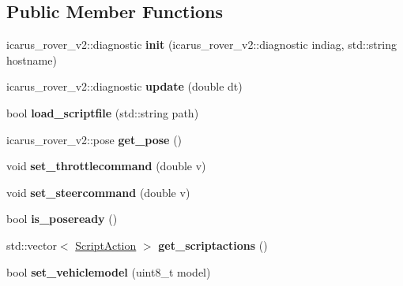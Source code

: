 \subsection*{Public Member Functions}
\begin{DoxyCompactItemize}
\item 
\mbox{\label{classSimulateNodeProcess_aa6d5582b3ebc13e2037b4e417303b46d}} 
icarus\+\_\+rover\+\_\+v2\+::diagnostic {\bfseries init} (icarus\+\_\+rover\+\_\+v2\+::diagnostic indiag, std\+::string hostname)
\item 
\mbox{\label{classSimulateNodeProcess_a0a40bd35c1c01b4da3da13ca603cde8e}} 
icarus\+\_\+rover\+\_\+v2\+::diagnostic {\bfseries update} (double dt)
\item 
\mbox{\label{classSimulateNodeProcess_a66bcc977a786a045d8e893504984001f}} 
bool {\bfseries load\+\_\+scriptfile} (std\+::string path)
\item 
\mbox{\label{classSimulateNodeProcess_a9b9aa14e25846adbd81a1302550bbece}} 
icarus\+\_\+rover\+\_\+v2\+::pose {\bfseries get\+\_\+pose} ()
\item 
\mbox{\label{classSimulateNodeProcess_a9837973a95a51e1115b735bfe565f44d}} 
void {\bfseries set\+\_\+throttlecommand} (double v)
\item 
\mbox{\label{classSimulateNodeProcess_a2387145742e04cd85162a1d42bb08fff}} 
void {\bfseries set\+\_\+steercommand} (double v)
\item 
\mbox{\label{classSimulateNodeProcess_a6f9b0ffc91863812540c03dc8865e976}} 
bool {\bfseries is\+\_\+poseready} ()
\item 
\mbox{\label{classSimulateNodeProcess_a40f40195269864c636959358f302cdd7}} 
std\+::vector$<$ \hyperlink{structScriptAction}{Script\+Action} $>$ {\bfseries get\+\_\+scriptactions} ()
\item 
\mbox{\label{classSimulateNodeProcess_a2a213ce1ed932b370498463509606aea}} 
bool {\bfseries set\+\_\+vehiclemodel} (uint8\+\_\+t model)

\end{DoxyCompactItemize}
